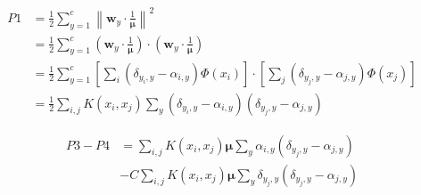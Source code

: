 \documentclass{article}
\begin{document}
\begin{align}
    P1 & = \frac{1}{2}  \sum_{y=1}^{c} {\left\|\mathbf{w}_{y} \cdot \frac{1}{\bm{\mu}} \right\|^{2}}                             \\
       & = \frac{1}{2}  \sum_{y=1}^{c} (\mathbf{w}_{y} \cdot \frac{1}{\bm{\mu}}) \cdot (\mathbf{w}_{y} \cdot \frac{1}{\bm{\mu}}) \\
       & = \frac{1}{2} \sum_{y=1}^{c} \left[\sum_{i}\left(\delta_{y_{i}, y}-\alpha_{i, y}\right) \Phi({x}_{i})\right] \cdot
    \left[\sum_{j}\left(\delta_{y_{j}, y}-\alpha_{j, y}\right) \Phi({x}_{j})\right]                                              \\
       & = \frac{1}{2} \sum_{i,j} K(x_i, x_j) \sum_{y}
    (\delta_{y_i, y}-\alpha_{i, y}) (\delta_{y_j, y}-\alpha_{j, y})
\end{align}

\begin{align}
    P3 - P4
     & = \sum_{i, j} K(x_i, x_j) \bm{\mu}
    \sum_{y} \alpha_{i, y} \left(\delta_{y_{j}, y}-\alpha_{j, y}\right) \\
     & -
    C
    \sum_{i, j} K(x_i, x_j) \bm{\mu}
    \sum_{y} \delta_{y_{j}, y} (\delta_{y_{j}, y}-\alpha_{j, y})
\end{align}
\end{document}
